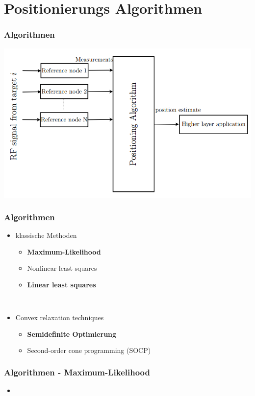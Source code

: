 \section{Positionierungs Algorithmen}
\label{sec:algorithmen}

\begin{frame}
  \frametitle{Algorithmen}

  \begin{center}
    \includegraphics[scale=0.35]{img/algo_1}
  \end{center}
\end{frame}

\begin{frame}
  \frametitle{Algorithmen}

  \begin{itemize}
  \item klassische Methoden
    \begin{itemize}
    \item \textbf{Maximum-Likelihood}
    \item Nonlinear least squares
    \item \textbf{Linear least squares}
    \end{itemize}
  ~\\
  \item Convex relaxation techniques
    \begin{itemize}
    \item \textbf{Semidefinite Optimierung}
    \item Second-order cone programming (SOCP)
    \end{itemize}
  \end{itemize}
\end{frame}

\begin{frame}
  \frametitle{Algorithmen - Maximum-Likelihood}

  \begin{itemize}
  \item 
  \end{itemize}
\end{frame}

